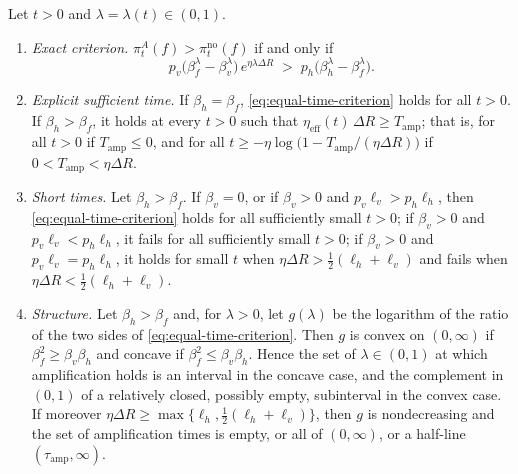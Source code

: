 \begin{proposition}
\label{prop:equal-time}
Let $t>0$ and $\lambda=\lambda(t)\in(0,1)$.
\begin{enumerate}
\item[\textup{(i)}] \emph{Exact criterion.}
$\pi^{A}_t(f)>\pi^{\mathrm{no}}_t(f)$ if and only if
\begin{equation}\label{eq:equal-time-criterion}
p_v\bigl(\beta_f^{\lambda}-\beta_v^{\lambda}\bigr)\,e^{\eta\lambda\Delta R}
\;>\;p_h\bigl(\beta_h^{\lambda}-\beta_f^{\lambda}\bigr).
\end{equation}
\item[\textup{(ii)}] \emph{Explicit sufficient time.} If $\beta_h=\beta_f$,
\eqref{eq:equal-time-criterion} holds for all $t>0$. If $\beta_h>\beta_f$,
it holds at every $t>0$ such that
$\eta_{\mathrm{eff}}(t)\,\Delta R\ge T_{\mathrm{amp}}$; that is, for all
$t>0$ if $T_{\mathrm{amp}}\le0$, and for all
$t\ge-\eta\log\bigl(1-T_{\mathrm{amp}}/(\eta\Delta R)\bigr)$ if
$0<T_{\mathrm{amp}}<\eta\Delta R$.
\item[\textup{(iii)}] \emph{Short times.} Let $\beta_h>\beta_f$. If
$\beta_v=0$, or if $\beta_v>0$ and $p_v\ell_v>p_h\ell_h$, then
\eqref{eq:equal-time-criterion} holds for all sufficiently small $t>0$; if
$\beta_v>0$ and $p_v\ell_v<p_h\ell_h$, it fails for all sufficiently small
$t>0$; if $\beta_v>0$ and $p_v\ell_v=p_h\ell_h$, it holds for small $t$ when $\eta\Delta R>\tfrac12(\ell_h+\ell_v)$ and fails when $\eta\Delta R<\tfrac12(\ell_h+\ell_v)$.
\item[\textup{(iv)}] \emph{Structure.} Let $\beta_h>\beta_f$ and, for
$\lambda>0$, let $g(\lambda)$ be the logarithm of the ratio of the two sides
of \eqref{eq:equal-time-criterion}. Then $g$ is convex on $(0,\infty)$ if
$\beta_f^2\ge\beta_v\beta_h$ and concave if
$\beta_f^2\le\beta_v\beta_h$. Hence the set of $\lambda\in(0,1)$ at which
amplification holds is an interval in the concave case, and the complement
in $(0,1)$ of a relatively closed, possibly empty, subinterval in the convex case. If moreover
$\eta\Delta R\ge\max\{\ell_h,\tfrac12(\ell_h+\ell_v)\}$, then $g$ is
nondecreasing and the set of amplification times is empty, or all of
$(0,\infty)$, or a half-line $(\tau_{\mathrm{amp}},\infty)$.
\end{enumerate}
\end{proposition}

